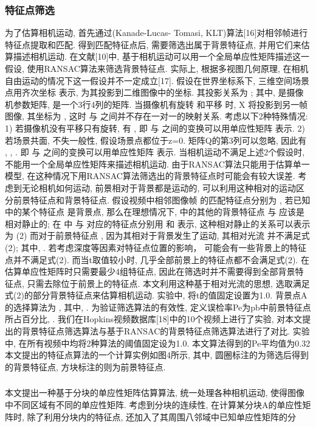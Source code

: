 \subsubsection{特征点筛选}
\label{ch5:sec:sub:sub:fp}
 为了估算相机运动, 首先通过(Kanade-Lucas- Tomasi, KLT)算法[16]对相邻帧进行特征点提取和匹配. 得到匹配特征点后, 需要筛选出属于背景特征点, 并用它们来估算描述相机运动. 在文献[10]中, 基于相机运动可以用一个全局单应性矩阵描述这一假设, 使用RANSAC算法来筛选背景特征点. 实际上, 根据多视图几何原理, 在相机自由运动的情况下这一假设并不一定成立[17]. 假设在世界坐标系下, 三维空间场景点用齐次坐标 表示, 为其投影到二维图像中的坐标. 其投影关系为 ; 其中,  是摄像机参数矩阵,  是一个3行4列的矩阵. 当摄像机有旋转 和平移 时, X 将投影到另一帧图像, 其坐标为 , 这时 与 之间并不存在一对一的映射关系. 考虑以下2种特殊情况:
1) 若摄像机没有平移只有旋转, 有   , 即 与 之间的变换可以用单应性矩阵 表示.
2) 若场景共面, 不失一般性, 假设场景点都位于z=0. 矩阵Q的第3列可以忽略, 因此有
 ,
 ,
 .
即 与 之间的变换可以用单应性矩阵 表示.
当相机运动不满足上述2个假设时, 不能用一个全局单应性矩阵来描述相机运动. 由于RANSAC算法只能用于估算单一模型, 在这种情况下用RANSAC算法筛选出的背景特征点时可能会有较大误差.
考虑到无论相机如何运动, 前景相对于背景都是运动的, 可以利用这种相对的运动区分前景特征点和背景特征点. 假设视频中相邻图像帧 的匹配特征点分别为 , 若已知 中的某个特征点 是背景点, 那么在理想情况下,  中的其他的背景特征点 与 应该是相对静止的; 在 中 与 对应的特征点分别用 和 表示, 这种相对静止的关系可以表示为
	 	(2)
而对于前景特征点 , 因为其相对于背景发生了运动, 其相对光流 并不满足式(2); 其中,  .
若考虑深度等因素对特征点位置的影响， 可能会有一些背景上的特征点并不满足式(2). 而当t取值较小时, 几乎全部前景上的特征点都不会满足式(2). 在估算单应性矩阵时只需要最少4组特征点, 因此在筛选时并不需要得到全部背景特征点, 只需去除位于前景上的特征点. 本文利用这种基于相对光流的思想, 选取满足式(2)的部分背景特征点来估算相机运动. 实验中, 将t的值固定设置为1.0. 背景点A的选择算法为 , 其中,  . 为验证筛选算法的有效性, 定义误检率Pe为pb中前景特征点所占百分比,  .
我们在Hopkins视频数据库[18]中的10个视频上进行了实验, 对本文提出的背景特征点筛选算法与基于RANSAC的背景特征点筛选算法进行了对比. 实验中, 在所有视频中均将2种算法的阈值固定设为1.0. 本文算法得到的Pe平均值为0.32%
本文提出的特征点算法的一个计算实例如图4所示, 其中, 圆圈标注的为筛选后得到的背景特征点, 方块标注的则为前景特征点.

\subsubsection{}
\label{ch5:sec:sub:sub:homography}
本文提出一种基于分块的单应性矩阵估算算法, 统一处理各种相机运动, 使得图像中不同区域有不同的单应性矩阵. 考虑到分块的连续性, 在计算某分块A的单应性矩阵时, 除了利用分块内的特征点, 还加入了其周围八邻域中已知单应性矩阵的分




